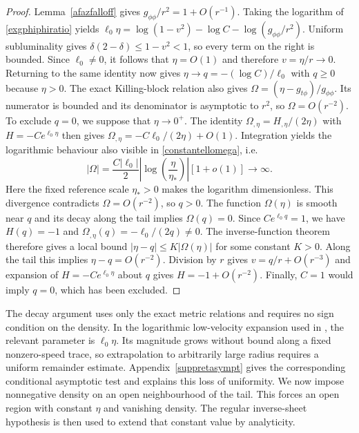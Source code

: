 \documentclass[amsmath,amsfonts,amssymb,aps,pra,superscriptaddress,10pt]{revtex4-2}
\numberwithin{equation}{section}
\theoremstyle{plain}
\theoremstyle{definition}
\theoremstyle{remark}
\theoremstyle{definition}
\newcommand{\ellzero}{\ell_0}
\begin{document}
\begin{proof}
Lemma~\ref{afazfalloff} gives $g_{\phi\phi}/r^2=1+O(r^{-1})$. Taking the logarithm of \eqref{exgphiphiratio} yields $\ellzero\eta=\log{(1-v^2)}-\log{C}-\log{(g_{\phi\phi}/r^2)}$. Uniform subluminality gives $\delta(2-\delta)\leq 1-v^2<1$, so every term on the right is bounded. Since $\ellzero\neq 0$, it follows that $\eta=O(1)$ and therefore $v=\eta/r\to 0$. Returning to the same identity now gives $\eta\to q=-(\log{C})/\ellzero$ with $q\geq 0$ because $\eta>0$. The exact Killing-block relation also gives $\Omega=(\eta-g_{t\phi})/g_{\phi\phi}$. Its numerator is bounded and its denominator is asymptotic to $r^2$, so $\Omega=O(r^{-2})$. To exclude $q=0$, we suppose that $\eta\to 0^+$. The identity $\Omega_{,\eta}=H_{,\eta}/(2\eta)$ with $H=-Ce^{\ellzero\eta}$  then gives $\Omega_{,\eta}=-C\ellzero/(2\eta)+O(1)$. Integration yields the logarithmic behaviour also visible in \eqref{constantellomega}, i.e.
\begin{equation}
|\Omega|=\frac{C|\ellzero|}{2}\left|\log{\left(\frac{\eta}{\eta_*}\right)}\right|[1+o(1)]\longrightarrow\infty.
\end{equation}
Here the fixed reference scale $\eta_*>0$ makes the logarithm dimensionless. This divergence contradicts $\Omega=O(r^{-2})$, so $q>0$. The function $\Omega(\eta)$ is smooth near $q$ and its decay along the tail implies $\Omega(q)=0$. Since $Ce^{\ellzero q}=1$, we have $H(q)=-1$ and $\Omega_{,\eta}(q)=-\ellzero/(2q)\neq 0$. The inverse-function theorem therefore gives a local bound $|\eta-q|\leq K|\Omega(\eta)|$ for some constant $K>0$. Along the tail this implies $\eta-q=O(r^{-2})$. Division by $r$ gives $v=q/r+O(r^{-3})$ and expansion of $H=-Ce^{\ellzero\eta}$ about $q$ gives $H=-1+O(r^{-2})$. Finally, $C=1$ would imply $q=0$, which has been excluded.
\end{proof}

The decay argument uses only the exact metric relations and requires no sign condition on the density. In the logarithmic low-velocity expansion used in \cite{Astesiano2022EPJC}, the relevant parameter is $\ellzero\eta$. Its magnitude grows without bound along a fixed nonzero-speed trace, so extrapolation to arbitrarily large radius requires a uniform remainder estimate. Appendix~\ref{suppretasympt} gives the corresponding conditional asymptotic test and explains this loss of uniformity. We now impose nonnegative density on an open neighbourhood of the tail. This forces an open region with constant $\eta$ and vanishing density. The regular inverse-sheet hypothesis is then used to extend that constant value by analyticity.
\end{document}
